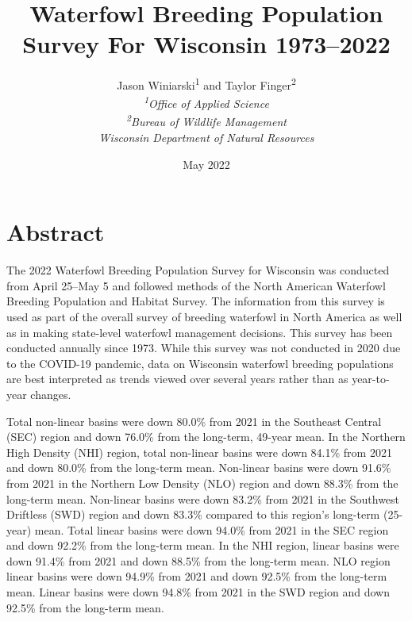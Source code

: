 \documentclass[
  12pt,
]{article}
\title{Waterfowl Breeding Population Survey For Wisconsin 1973--2022}
\author{Jason Winiarski\textsuperscript{1} and Taylor
Finger\textsuperscript{2}\\
\emph{\textsuperscript{1}Office of Applied Science}\\
\emph{\textsuperscript{2}Bureau of Wildlife Management}\\
\emph{Wisconsin Department of Natural Resources}}
\date{May 2022}
\begin{document}
\maketitle

{
\hypersetup{linkcolor=}
\setcounter{tocdepth}{3}
\tableofcontents
}
\newpage

\hypertarget{abstract}{%
\section{Abstract}\label{abstract}}

The 2022 Waterfowl Breeding Population Survey for Wisconsin was
conducted from April 25--May 5 and followed methods of the North
American Waterfowl Breeding Population and Habitat Survey. The
information from this survey is used as part of the overall survey of
breeding waterfowl in North America as well as in making state-level
waterfowl management decisions. This survey has been conducted annually
since 1973. While this survey was not conducted in 2020 due to the
COVID-19 pandemic, data on Wisconsin waterfowl breeding populations are
best interpreted as trends viewed over several years rather than as
year-to-year changes.

Total non-linear basins were down 80.0\% from 2021 in the Southeast
Central (SEC) region and down 76.0\% from the long-term, 49-year mean.
In the Northern High Density (NHI) region, total non-linear basins were
down 84.1\% from 2021 and down 80.0\% from the long-term mean.
Non-linear basins were down 91.6\% from 2021 in the Northern Low Density
(NLO) region and down 88.3\% from the long-term mean. Non-linear basins
were down 83.2\% from 2021 in the Southwest Driftless (SWD) region and
down 83.3\% compared to this region's long-term (25-year) mean. Total
linear basins were down 94.0\% from 2021 in the SEC region and down
92.2\% from the long-term mean. In the NHI region, linear basins were
down 91.4\% from 2021 and down 88.5\% from the long-term mean. NLO
region linear basins were down 94.9\% from 2021 and down 92.5\% from the
long-term mean. Linear basins were down 94.8\% from 2021 in the SWD
region and down 92.5\% from the long-term mean.
\end{document}

